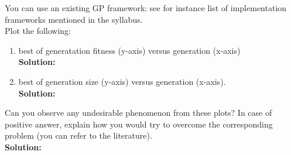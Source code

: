 \documentclass[a4paper]{article}
\begin{document}
\begin{enumerate}
You can use an existing GP framework: see for instance list of implementation frameworks mentioned in the syllabus.\\

Plot the following:

\begin{enumerate}
	\item best of generatation fitness (y-axis) versus generation (x-axis)\\
	\textbf{Solution:}\\
	
	\item best of generation size (y-axis) versus generation (x-axis).\\
	\textbf{Solution:}\\
\end{enumerate}

Can you observe any undesirable phenomenon from these plots? In case of positive answer, explain how you would try to overcome the corresponding problem (you can refer to the literature).\\
\textbf{Solution:}\\

\end{enumerate}
\end{document}
